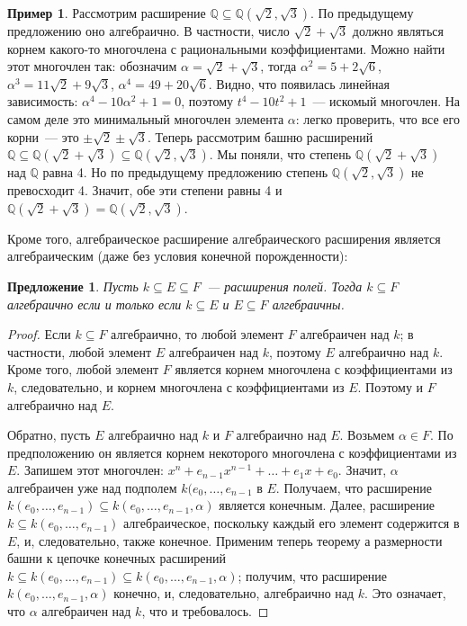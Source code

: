 \documentclass[a4paper,11pt]{scrartcl}
\theoremstyle{plain}
\newtheorem{proposition}[theorem]{Предложение}
\theoremstyle{definition}
\newtheorem{example}[theorem]{Пример}
\newcommand\mb{\mathbb}
\newcommand\sseq{\subseteq}
\begin{document}
\begin{example}\label{example:sqrt2+sqrt3}
Рассмотрим расширение $\mb Q\subseteq \mb Q(\sqrt{2},\sqrt{3})$. По
предыдущему предложению оно алгебраично. В частности, число
$\sqrt{2}+\sqrt{3}$ должно являться корнем какого-то многочлена с
рациональными коэффициентами. Можно найти этот многочлен так:
обозначим $\alpha=\sqrt{2}+\sqrt{3}$, тогда $\alpha^2=5+2\sqrt{6}$,
$\alpha^3=11\sqrt{2}+9\sqrt{3}$, $\alpha^4=49+20\sqrt{6}$. Видно, что
появилась линейная зависимость: $\alpha^4-10\alpha^2+1=0$, поэтому
$t^4-10t^2+1$~--- искомый многочлен. На самом деле это минимальный
многочлен элемента $\alpha$: легко проверить, что все его корни~---
это
$\pm\sqrt{2}\pm\sqrt{3}$. Теперь рассмотрим башню расширений
$\mb Q\sseq\mb Q(\sqrt{2}+\sqrt{3})\sseq\mb Q(\sqrt{2},\sqrt{3})$. Мы
поняли, что степень $\mb Q(\sqrt{2}+\sqrt{3})$ над $\mb Q$ равна 4. Но
по предыдущему предложению степень $\mb Q(\sqrt{2},\sqrt{3})$ не
превосходит 4. Значит, обе эти степени равны 4 и
$\mb Q(\sqrt{2}+\sqrt{3})=\mb Q(\sqrt{2},\sqrt{3})$.
\end{example}

Кроме того, алгебраическое расширение
алгебраического расширения является алгебраическим (даже без условия
конечной порожденности):

\begin{proposition}
Пусть $k\subseteq E\subseteq F$~--- расширения полей. Тогда
$k\subseteq F$ алгебраично если и только если $k\subseteq E$ и
$E\subseteq F$ алгебраичны.
\end{proposition}
\begin{proof}
Если $k\subseteq F$ алгебраично, то любой элемент $F$ алгебраичен над
$k$; в частности, любой элемент $E$ алгебраичен над $k$, поэтому $E$
алгебраично над $k$. Кроме того, любой элемент $F$ является корнем
многочлена с коэффициентами из $k$, следовательно, и корнем многочлена
с коэффициентами из $E$. Поэтому и $F$ алгебраично над $E$.

Обратно, пусть $E$ алгебраично над $k$ и $F$ алгебраично над
$E$. Возьмем $\alpha\in F$. По предположению он является корнем
некоторого
многочлена с коэффициентами из $E$. Запишем этот многочлен:
$x^n+e_{n-1}x^{n-1}+\dots+e_1x+e_0$. Значит, $\alpha$ алгебраичен уже
над
подполем $k(e_0,\dots,e_{n-1}$ в $E$. Получаем, что расширение
$k(e_0,\dots,e_{n-1})\subseteq k(e_0,\dots,e_{n-1},\alpha)$ является
конечным.
Далее, расширение $k\subseteq k(e_0,\dots,e_{n-1})$
алгебраическое, поскольку каждый его элемент содержится в $E$,
и, следовательно, также конечное. Применим теперь теорему а
размерности башни к цепочке конечных расширений $k\subseteq
k(e_0,\dots,e_{n-1})\subseteq k(e_0,\dots,e_{n-1},\alpha)$; получим,
что
расширение $k(e_0,\dots,e_{n-1},\alpha)$ конечно, и, следовательно,
алгебраично над $k$. Это означает, что $\alpha$ алгебраичен над $k$,
что и
требовалось.
\end{proof}
\end{document}
